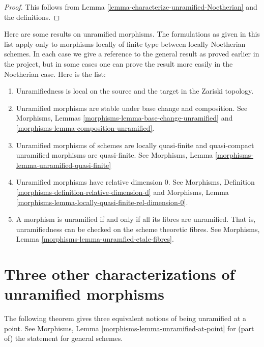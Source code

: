 \begin{proof}
This follows from Lemma \ref{lemma-characterize-unramified-Noetherian}
and the definitions.
\end{proof}

\noindent
Here are some results on unramified morphisms.
The formulations as given in this list apply only to
morphisms locally of finite type between locally Noetherian schemes.
In each case we give a reference to the general result as
proved earlier in the project, but in some cases one can
prove the result more easily in the Noetherian case.
Here is the list:
\begin{enumerate}
\item Unramifiedness is local on the source and the target in the Zariski
topology.
\item Unramified morphisms are stable under base change and composition.
See Morphisms, Lemmas \ref{morphisms-lemma-base-change-unramified}
and \ref{morphisms-lemma-composition-unramified}.
\item Unramified morphisms of schemes are locally quasi-finite
and quasi-compact unramified morphisms are quasi-finite.
See Morphisms, Lemma \ref{morphisms-lemma-unramified-quasi-finite}
\item Unramified morphisms have relative dimension $0$. See
Morphisms, Definition \ref{morphisms-definition-relative-dimension-d}
and
Morphisms, Lemma \ref{morphisms-lemma-locally-quasi-finite-rel-dimension-0}.
\item A morphism is unramified if and only if all its fibres are unramified.
That is, unramifiedness can be checked on the scheme theoretic fibres. See
Morphisms, Lemma \ref{morphisms-lemma-unramfied-etale-fibres}.
\end{enumerate}

\section{Three other characterizations of unramified morphisms}
\label{section-three-other}

\noindent
The following theorem gives three equivalent notions of being
unramified at a point. See
Morphisms, Lemma \ref{morphisms-lemma-unramified-at-point}
for (part of) the statement for general schemes.


